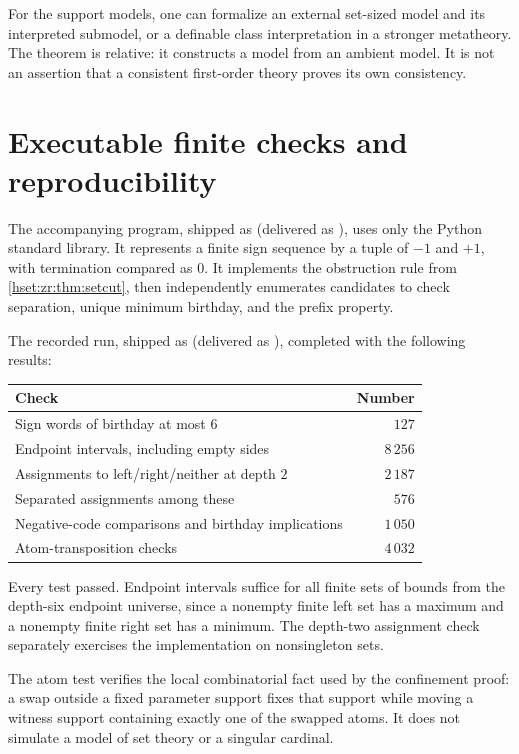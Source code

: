 \documentclass[11pt,letterpaper]{article}
\theoremstyle{definition}
\theoremstyle{remark}
\begin{document}
For the support models, one can formalize an external set-sized model and its interpreted submodel, or a definable class interpretation in a stronger metatheory. The theorem is relative: it constructs a model from an ambient model. It is not an assertion that a consistent first-order theory proves its own consistency.

\section{Executable finite checks and reproducibility}
\label{hset:zr:sec:checks}
The accompanying program, shipped as  (delivered as ), uses only the Python standard library. It represents a finite sign sequence by a tuple of $-1$ and $+1$, with termination compared as $0$. It implements the obstruction rule from \cref{hset:zr:thm:setcut}, then independently enumerates candidates to check separation, unique minimum birthday, and the prefix property.

The recorded run, shipped as  (delivered as ), completed with the following results:
\begin{center}
\begin{tabular}{@{}lr@{}}
\toprule
Check & Number \\
\midrule
Sign words of birthday at most $6$ & $127$ \\
Endpoint intervals, including empty sides & $8\,256$ \\
Assignments to left/right/neither at depth $2$ & $2\,187$ \\
Separated assignments among these & $576$ \\
Negative-code comparisons and birthday implications & $1\,050$ \\
Atom-transposition checks & $4\,032$ \\
\bottomrule
\end{tabular}
\end{center}
Every test passed. Endpoint intervals suffice for all finite sets of bounds from the depth-six endpoint universe, since a nonempty finite left set has a maximum and a nonempty finite right set has a minimum. The depth-two assignment check separately exercises the implementation on nonsingleton sets.

The atom test verifies the local combinatorial fact used by the confinement proof: a swap outside a fixed parameter support fixes that support while moving a witness support containing exactly one of the swapped atoms. It does not simulate a model of set theory or a singular cardinal.
\end{document}
